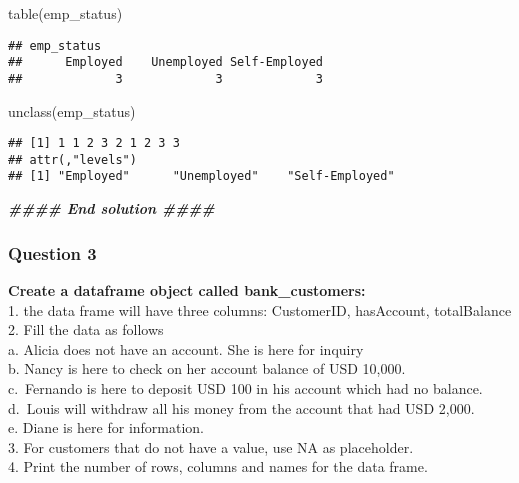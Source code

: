 \documentclass[
]{article}
\newenvironment{Shaded}{\begin{snugshade}}{\end{snugshade}}
\newcommand{\DocumentationTok}[1]{\textcolor[rgb]{0.56,0.35,0.01}{\textbf{\textit{#1}}}}
\newcommand{\FunctionTok}[1]{\textcolor[rgb]{0.00,0.00,0.00}{#1}}
\newcommand{\NormalTok}[1]{#1}
\begin{document}
\begin{Shaded}
\begin{Highlighting}[]
\FunctionTok{table}\NormalTok{(emp\_status)}
\end{Highlighting}
\end{Shaded}

\begin{verbatim}
## emp_status
##      Employed    Unemployed Self-Employed 
##             3             3             3
\end{verbatim}

\begin{Shaded}
\begin{Highlighting}[]
\FunctionTok{unclass}\NormalTok{(emp\_status)}
\end{Highlighting}
\end{Shaded}

\begin{verbatim}
## [1] 1 1 2 3 2 1 2 3 3
## attr(,"levels")
## [1] "Employed"      "Unemployed"    "Self-Employed"
\end{verbatim}

\begin{Shaded}
\begin{Highlighting}[]
\DocumentationTok{\#\#\#\# End solution \#\#\#\#}
\end{Highlighting}
\end{Shaded}

\hypertarget{question-3}{%
\subsubsection{Question 3}\label{question-3}}

\textbf{Create a dataframe object called bank\_customers:}\\
1. the data frame will have three columns: CustomerID, hasAccount,
totalBalance\\
2. Fill the data as follows\\
a. Alicia does not have an account. She is here for inquiry\\
b. Nancy is here to check on her account balance of USD 10,000.\\
c.~Fernando is here to deposit USD 100 in his account which had no
balance.\\
d.~Louis will withdraw all his money from the account that had USD
2,000.\\
e. Diane is here for information.\\
3. For customers that do not have a value, use NA as placeholder.\\
4. Print the number of rows, columns and names for the data frame.
\end{document}
